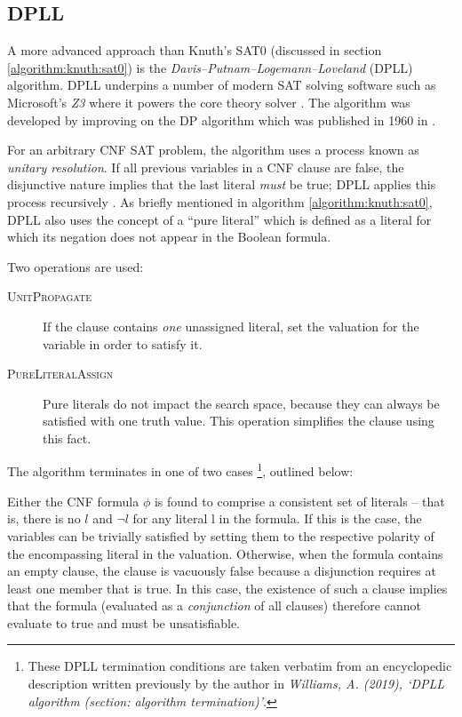 \documentclass[a4paper,openany,12pt]{book}
\begin{document}
\label{algorithm:knuth:sat0}

\subsection{DPLL}

A more advanced approach than Knuth's SAT0 (discussed in section \ref{algorithm:knuth:sat0}) is the
\emph{Davis–Putnam–Logemann–Loveland} (DPLL) algorithm.
DPLL underpins a number of modern SAT solving software such as Microsoft's \emph{Z3} where it powers the core theory
solver \citep{de2008z3}.
The algorithm was developed by improving on the DP algorithm which was published in 1960 in
\citet{Davis:1960:CPQ:321033.321034}.

For an arbitrary CNF SAT problem, the algorithm uses a process known as \emph{unitary resolution}.
If all previous variables in a CNF clause are false, the disjunctive nature implies that the last literal \emph{must} be
true; DPLL applies this process recursively \citep{russell2016artificial}.
As briefly mentioned in algorithm \ref{algorithm:knuth:sat0}, DPLL also uses the concept of a ``pure literal'' which is
defined as a literal for which its negation does not appear in the Boolean formula.

Two operations are used:

\begin{description}
    \item[\textsc{UnitPropagate}] If the clause contains \emph{one} unassigned literal,
                                  set the valuation for the variable in order to satisfy it.
    \item[\textsc{PureLiteralAssign}] Pure literals do not impact the search space, because they can always be satisfied
                                      with one truth value.
                                      This operation simplifies the clause using this fact.
\end{description}

The algorithm terminates in one of two cases \footnote{%
    These DPLL termination conditions are taken verbatim from an encyclopedic description written previously by the
    author in \emph{Williams, A. (2019), `DPLL algorithm (section: algorithm termination)'}.
}, outlined below:

Either the CNF formula $\phi$ is found to comprise a consistent set of literals -- that is, there is no $l$ and $\neg l$
for any literal l in the formula.
If this is the case, the variables can be trivially satisfied by setting them to the respective polarity of the
encompassing literal in the valuation.
Otherwise, when the formula contains an empty clause, the clause is vacuously false because a disjunction requires at
least one member that is true.
In this case, the existence of such a clause implies that the formula (evaluated as a \emph{conjunction} of all clauses)
therefore cannot evaluate to true and must be unsatisfiable.
\end{document}
